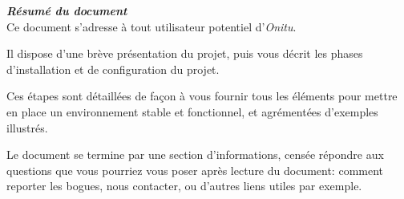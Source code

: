 \thispagestyle{empty}
\vspace*{10mm}

\textbf{\emph{\textcolor{onitu}{\large{Résumé du document} } } }\\

Ce document s'adresse à tout utilisateur potentiel d'\emph{Onitu}.

Il dispose d'une brève présentation du projet, puis vous décrit les phases d'installation et de configuration du projet.

Ces étapes sont détaillées de façon à vous fournir tous les éléments pour mettre en place un environnement stable et fonctionnel, et agrémentées d'exemples illustrés.

Le document se termine par une section d'informations, censée répondre aux questions que vous pourriez vous poser après lecture du document: comment reporter les bogues, nous contacter, ou d'autres liens utiles par exemple.

\clearpage
